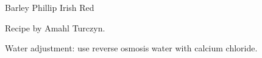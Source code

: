\documentclass[parskip=half,fontsize=9pt,oneside]{scrbook}
\begin{document}
\mainmatter


\begin{recipe}{Barley Phillip Irish Red}

\begin{aboutblock}
Recipe by Amahl Turczyn. 
\end{aboutblock}


\begin{methodandtiming}
 
\begin{mashsteps}
\end{mashsteps}

\begin{fermentationsteps}
\end{fermentationsteps}

\begin{directions}
Water adjustment: use reverse osmosis water with  calcium chloride.
\end{directions}

\end{methodandtiming}

\recipebreak

\begin{ingredientsblock}

\begin{malts}
\end{malts}

\begin{hops}
\end{hops}


\end{ingredientsblock}

\end{recipe}


\end{document}
